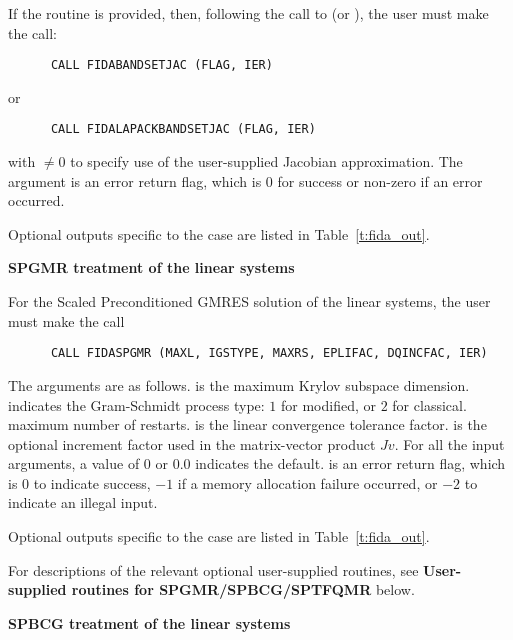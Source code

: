 \begin{Steps}
  If the  routine is provided, then, following the call to
   (or ), the user must make the call:
\begin{verbatim}
      CALL FIDABANDSETJAC (FLAG, IER)
\end{verbatim}
  or
\begin{verbatim}
      CALL FIDALAPACKBANDSETJAC (FLAG, IER)
\end{verbatim}
  with  $\neq 0$ to specify use of the user-supplied Jacobian
  approximation.  The argument  is an error return flag, which is $0$ 
  for success or non-zero if an error occurred.
  
  Optional outputs specific to the {\band} case are listed in
  Table~\ref{t:fida_out}.


  {\s}{\p} {\bf SPGMR treatment of the linear systems}
  
  For the Scaled Preconditioned GMRES solution of the linear systems,
  the user must make the call
\begin{verbatim}
      CALL FIDASPGMR (MAXL, IGSTYPE, MAXRS, EPLIFAC, DQINCFAC, IER)
\end{verbatim}
  The arguments are as follows.
   is the maximum Krylov subspace dimension.
   indicates the Gram-Schmidt process type: $1$ for modified,
   or $2$ for classical.
   maximum number of restarts.
   is the linear convergence tolerance factor.
   is the optional increment factor used in the matrix-vector product
  $Jv$.
  For all the input arguments, a value of 0 or $0.0$ indicates the default.
   is an error return flag, which is $0$ to indicate success, $-1$
  if a memory allocation failure occurred, or $-2$ to indicate an illegal input.
  
  Optional outputs specific to the {\spgmr} case are listed in
  Table~\ref{t:fida_out}.

  For descriptions of the relevant optional user-supplied routines, see 
  {\bf User-supplied routines for SPGMR/SPBCG/SPTFQMR} below.


  {\s}{\p} {\bf SPBCG treatment of the linear systems}
  

\end{Steps}
